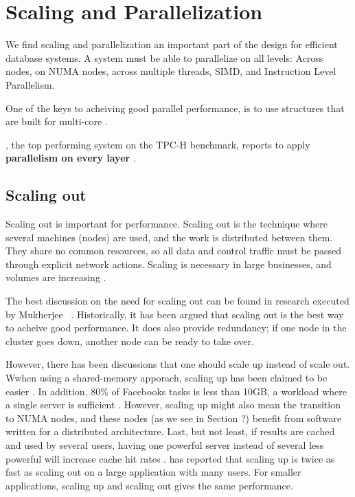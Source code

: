 \chapter{Scaling and Parallelization}
\label{chap:Scaling and Parallelization}
We find scaling and parallelization an important part of the design for efficient database systems. A system must be able to parallelize on all levels: Across nodes, on NUMA nodes, across multiple threads, SIMD, and Instruction Level Parallelism. 

One of the keys to acheiving good parallel performance, is to use structures that are built for multi-core \cite{Primsch2011-ij}.

\exasol, the top performing system on the TPC-H benchmark, reports to apply \textbf{parallelism on every layer} \cite{Exasol2014-xh}.

\newpage
\section{Scaling out}
\label{sec:Scaling out}
Scaling out is important for performance. Scaling out is the technique where several machines (nodes) are used, and the work is distributed between them. They share no common resources, so all data and control traffic must be passed through explicit network actions. Scaling is necessary in large businesses, and volumes are increasing \cite{Qlik2012-ku}.

The best discussion on the need for scaling out can be found in research executed by Mukherjee \ea~\cite{Mukherjee2015-ul}. Historically, it has been argued that scaling out is the best way to acheive good performance. It does also provide redundancy; if one node in the cluster goes down, another node can be ready to take over.

However, there has been discussions that one should scale up instead of scale out. Wwhen using a shared-memory apporach, scaling up has been claimed to be easier \cite{Boncz2002-yj}. In addition, 80\% of Facebooks tasks is less than 10GB, a workload where a single server is sufficient \cite{Mukherjee2015-ul}. However, scaling up might also mean the transition to NUMA nodes, and these nodes (as we see in Section ?) benefit from software written for a distributed architecture. Last, but not least, if results are cached and used by several users, having one powerful server instead of several less powerful will increase cache hit rates \cite{qlik2012-ku}. \qlikview has reported that scaling up is twice as fast as scaling out on a large application with many users. For smaller applications, scaling up and scaling out gives the same performance.


